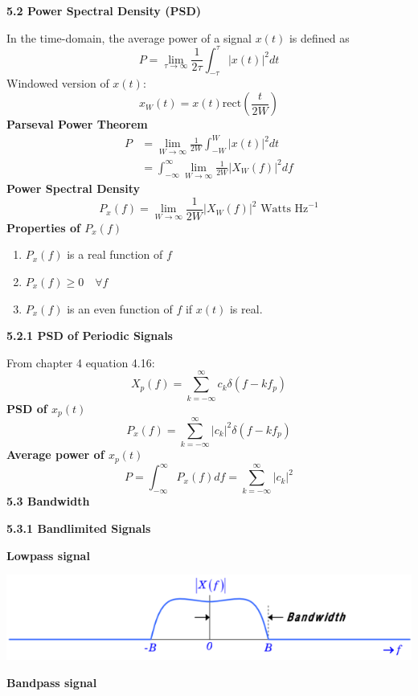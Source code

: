 \documentclass[landscape,a4paper]{extarticle}
\newenvironment{Figure}
  {\noindent\minipage{\linewidth}}
  {\endminipage\par\medskip}
\begin{document}
\begin{multicols*}{5}
    \textbf{5.2 Power Spectral Density (PSD)}

    In the time-domain, the average power of a signal $x(t)$ is defined as 
    \[
        P=\lim_{\tau \to \infty} \frac{1}{2\tau}\int_{-\tau}^{\tau}|x(t)|^2 dt \tag{5.4}
    \]
    Windowed version of $x(t)$:
    \[
        x_W(t)=x(t)\text{rect}\left(\frac{t}{2W}\right) \tag{5.5}
    \]
    \textbf{Parseval Power Theorem}
    \begin{align*}
        P&=\lim_{W \to \infty}\frac{1}{2W}\int_{-W}^{W}|x(t)|^2dt\\
        &=\int_{-\infty}^{\infty}\lim_{W \to \infty}\frac{1}{2W}|X_W(f)|^2df \tag{5.9}
    \end{align*}
    \textbf{Power Spectral Density}
    \[
        {P_x(f)=\lim_{W \to \infty}\frac{1}{2W}|X_W(f)|^2} \text{ Watts Hz}^{-1} \tag{5.10}
    \]
    \textbf{Properties of $P_x(f)$}
    \begin{enumerate}
        \item $P_x(f)$ is a real function of $f$
        \item $P_x(f) \geq 0 \quad \forall f$
        \item $P_x(f)$ is an even function of $f$ if $x(t)$ is real.
    \end{enumerate}

    \textbf{5.2.1 PSD of Periodic Signals}

    From chapter 4 equation 4.16:
    \[
        X_p(f)=\sum_{k=-\infty}^{\infty}c_k \delta (f-kf_p)
    \]
    \textbf{PSD of $x_p(t)$}
    \[
        P_x(f)=\sum_{k=-\infty}^{\infty}|c_k|^2\delta (f-kf_p) \tag{5.12}
    \]
    \textbf{Average power of $x_p(t)$}
    \[
        P=\int_{-\infty}^{\infty}P_x(f)df=\sum_{k=-\infty}^{\infty}|c_k|^2 \tag{5.13}
    \]
    \textbf{5.3 Bandwidth}

    \textbf{5.3.1 Bandlimited Signals}

    \textbf{Lowpass signal}

    \begin{Figure}
        \centering
        \includegraphics[width=\linewidth]{bandlimitedLowpassSignal.png}
    \end{Figure}
    \textbf{Bandpass signal}


\end{multicols*}
\end{document}

